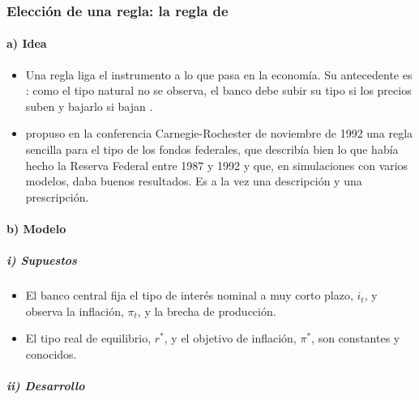 \documentclass[11pt]{article}
\begin{document}
\subsubsection{Elección de una regla: la regla de }\label{sec:taylor}

\paragraph{a) Idea}

\begin{itemize}
\item Una regla liga el instrumento a lo que pasa en la economía. Su antecedente es \textcite{Wicksell1898Geldzins}: como el tipo natural no se observa, el banco debe subir su tipo si los precios suben y bajarlo si bajan .
\item {} propuso en la conferencia Carnegie-Rochester de noviembre de 1992 una regla sencilla para el tipo de los fondos federales, que describía bien lo que había hecho la Reserva Federal entre 1987 y 1992 y que, en simulaciones con varios modelos, daba buenos resultados\nocite{Taylor1993}. Es a la vez una descripción y una prescripción.
\end{itemize}

\paragraph{b) Modelo}

\subparagraph{i) Supuestos}

\begin{itemize}
\item El banco central fija el tipo de interés nominal a muy corto plazo, $i_t$, y observa la inflación, $\pi_t$, y la brecha de producción.
\item El tipo real de equilibrio, $r^*$, y el objetivo de inflación, $\pi^*$, son constantes y conocidos.
\end{itemize}

\subparagraph{ii) Desarrollo}
\end{document}
